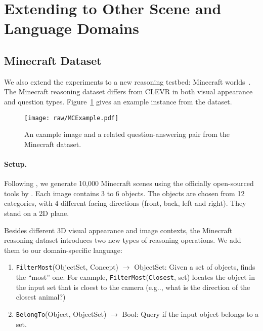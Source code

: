 \documentclass{article} \usepackage{iclr2019_conference,times}
\makeatletter
\DeclareRobustCommand\onedot{\futurelet\@let@token\@onedot}
\def\@onedot{\ifx\@let@token.\else.\null\fi\xspace}
\def\eg{e.g\onedot} \def\Eg{E.g\onedot}
\makeatother
\begin{document}
{\section{Extending to Other Scene and Language Domains}
\label{sec:app:new}

\subsection{Minecraft Dataset}
\label{sec:app:mc}
We also extend the experiments to a new reasoning testbed: Minecraft worlds~\citep{kexin}. The Minecraft reasoning dataset differs from CLEVR in both visual appearance and question types. Figure~\ref{fig:mc:example} gives an example instance from the dataset.

\begin{figure}[thbp]
    \centering
    \texttt{[image: raw/MCExample.pdf]}
    \caption{An example image and a related question-answering pair from the Minecraft dataset.}
    \label{fig:mc:example}
\end{figure}

\paragraph{Setup. } Following \cite{kexin}, we generate 10,000 Minecraft scenes using the officially open-sourced tools by \cite{Wu2017Neural}. Each image contains 3 to 6 objects. The objects are chosen from 12 categories, with 4 different facing directions (front, back, left and right). They stand on a 2D plane.

Besides different 3D visual appearance and image contexts, the Minecraft reasoning dataset introduces two new types of reasoning operations. We add them to our domain-specific language:

\begin{enumerate}
    \item {\tt FilterMost}(ObjectSet, Concept) $\rightarrow$ ObjectSet: Given a set of objects, finds the ``most'' one. For example, {\tt FilterMost}({\tt Closest}, set) locates the object in the input set that is cloest to the camera (\eg, what is the direction of the closest animal?)
    \item {\tt BelongTo}(Object, ObjectSet) $\rightarrow$ Bool: Query if the input object belongs to a set.
\end{enumerate}

}
\end{document}
